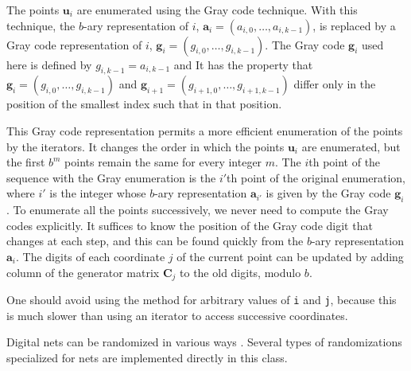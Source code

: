 The points $\mathbf{u}_i$ are enumerated using the Gray code
technique.
With this technique, the $b$-ary representation of $i$,
$\mathbf{a}_i = (a_{i,0}, \dots, a_{i,k-1})$, is replaced  by a Gray code representation of $i$,
$\mathbf{g}_i = (g_{i,0}, \dots, g_{i,k-1})$. The Gray code $\mathbf{g}_i$
 used here is defined by $g_{i,k-1} = a_{i,k-1}$ and
It has the property that
$\mathbf{g}_i = (g_{i,0}, \dots, g_{i,k-1})$ and
$\mathbf{g}_{i+1} = (g_{i+1,0}, \dots, g_{i+1,k-1})$
differ only in the position of the smallest index
\latex{$\ell$}\html{$\nu$} such that
in that position.

This Gray code representation permits a more efficient enumeration
of the points by the iterators.
It changes the order in which the points $\mathbf{u}_i$ are enumerated,
but the first $b^m$ points remain the same for every integer $m$.
The $i$th point of the sequence with the Gray enumeration
is the $i'$th point of the original enumeration, where $i'$ is the
integer whose $b$-ary representation $\mathbf{a}_{i'}$ is given by the Gray
code $\mathbf{g}_i$.
To enumerate all the points successively, we never need to compute
the Gray codes explicitly.
It suffices to know the position \latex{$\ell$}\html{$\nu$} of the Gray code digit
that changes at each step, and this can be found quickly from the
$b$-ary representation $\mathbf{a}_i$.
The digits of each coordinate $j$ of the current point can be updated by
adding column \latex{$\ell$}\html{$\nu$} of the generator matrix $\mathbf{C}_j$ to the old digits,
modulo $b$.

One should avoid using the method 
for arbitrary values of \texttt{i} and \texttt{j}, because this is much
slower than using an iterator to access successive coordinates.

Digital nets can be randomized in various ways
\cite{mMAT99a,rFAU02a,vLEC02a,vOWE03a}.
Several types of randomizations specialized for nets are implemented
directly in this class.

